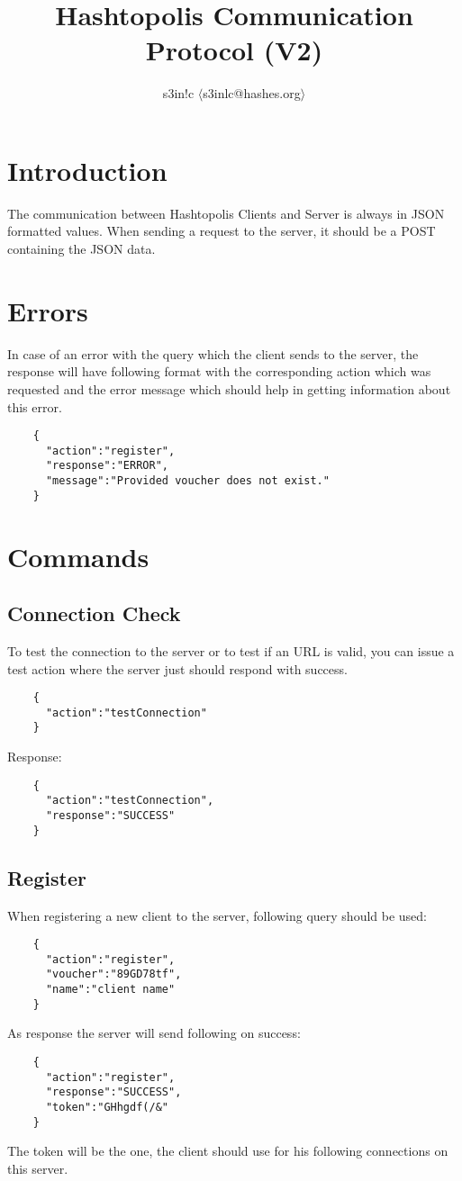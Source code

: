 \documentclass{article}
\author{s3in!c $\langle$s3inlc@hashes.org$\rangle$ }
\begin{document}
	\title{Hashtopolis Communication Protocol (V2)}
	\maketitle
	\section*{Introduction}
	The communication between Hashtopolis Clients and Server is always in JSON formatted values. When sending a request to the server, it should be a POST containing the JSON data.

	\section*{Errors}
	In case of an error with the query which the client sends to the server, the response will have following format with the corresponding action which was requested and the error message which should help in getting information about this error.
	\begin{verbatim}
	{
	  "action":"register",
	  "response":"ERROR",
	  "message":"Provided voucher does not exist."
	}
	\end{verbatim}
	\pagebreak
	\section*{Commands}
	
	\subsection*{Connection Check}
	To test the connection to the server or to test if an URL is valid, you can issue a test action where the server just should respond with success.
	\begin{verbatim}
	{
	  "action":"testConnection"
	}
	\end{verbatim}
	Response:
	\begin{verbatim}
	{
	  "action":"testConnection",
	  "response":"SUCCESS"
	} 
	\end{verbatim}

	\subsection*{Register}
	When registering a new client to the server, following query should be used:
	\begin{verbatim}
	{
	  "action":"register",
	  "voucher":"89GD78tf",
	  "name":"client name"
	}
	\end{verbatim}
	As response the server will send following on success:
	\begin{verbatim}
	{
	  "action":"register",
	  "response":"SUCCESS",
	  "token":"GHhgdf(/&"
	} 
	\end{verbatim}
	The token will be the one, the client should use for his following connections on this server.
	
\end{document}
